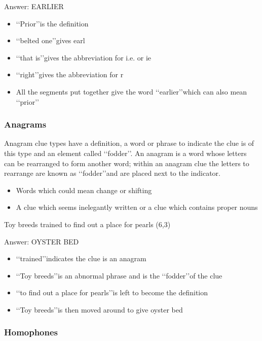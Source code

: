 Answer: EARLIER 

\begin{itemize}
	\item \lq\lq Prior\rq\rq is the definition 
	\item \lq\lq belted one\rq\rq gives earl 
	\item \lq\lq that is\rq\rq gives the abbreviation for i.e. or ie 
	\item \lq\lq right\rq\rq gives the abbreviation for r 
	\item All the segments put together give the word \lq\lq earlier\rq\rq which can also mean \lq\lq prior\rq\rq
\end{itemize}

\subsubsection{Anagrams}

Anagram clue types have a definition, a word or phrase to indicate the clue is of this type and an element called \lq\lq fodder\rq\rq. An anagram is a word whose letters can be rearranged to form another word; within an anagram clue the letters to rearrange are known as \lq\lq fodder\rq\rq and are placed next to the indicator.  

\begin{itemize} 
	\item Words which could mean change or shifting 
	\item A clue which seems inelegantly written or a clue which contains proper nouns
\end{itemize}


Toy breeds trained to find out a place for pearls (6,3) 

Answer: OYSTER BED 

\begin{itemize}
	\item \lq\lq trained\rq\rq indicates the clue is an anagram   
	\item \lq\lq Toy breeds\rq\rq is an abnormal phrase and is the \lq\lq fodder\rq\rq of the clue 
	\item \lq\lq to find out a place for pearls\rq\rq is left to become the definition 
	\item \lq\lq Toy breeds\rq\rq is then moved around to give oyster bed 
\end{itemize}

\subsubsection{Homophones}

